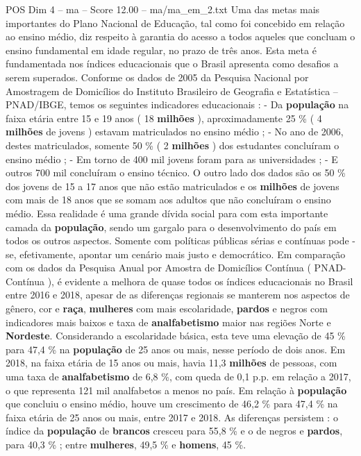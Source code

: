 \begin{textsample}{POS Dim 4 – ma – Score 12.00 – ma/ma\_em\_2.txt}
Uma das metas mais importantes do Plano Nacional de Educação, tal como foi concebido em relação ao ensino médio, diz respeito à garantia do acesso a todos aqueles que concluam o ensino fundamental em idade regular, no prazo de três anos.
Esta meta é fundamentada nos índices educacionais que o Brasil apresenta como desafios a serem superados.
Conforme os dados de 2005 da Pesquisa Nacional por Amostragem de Domicílios do Instituto Brasileiro de Geografia e Estatística – PNAD/IBGE, temos os seguintes indicadores educacionais : - Da \textbf{população} na faixa etária entre 15 e 19 anos ( 18 \textbf{milhões} ), aproximadamente 25 \% ( 4 \textbf{milhões} de jovens ) estavam matriculados no ensino médio ; - No ano de 2006, destes matriculados, somente 50 \% ( 2 \textbf{milhões} ) dos estudantes concluíram o ensino médio ; - Em torno de 400 mil jovens foram para as universidades ; - E outros 700 mil concluíram o ensino técnico.
O outro lado dos dados são os 50 \% dos jovens de 15 a 17 anos que não estão matriculados e os \textbf{milhões} de jovens com mais de 18 anos que se somam aos adultos que não concluíram o ensino médio.
Essa realidade é uma grande dívida social para com esta importante camada da \textbf{população}, sendo um gargalo para o desenvolvimento do país em todos os outros aspectos.
Somente com políticas públicas sérias e contínuas pode -se, efetivamente, apontar um cenário mais justo e democrático.
Em comparação com os dados da Pesquisa Anual por Amostra de Domicílios Contínua ( PNAD-Contínua ), é evidente a melhora de quase todos os índices educacionais no Brasil entre 2016 e 2018, apesar de as diferenças regionais se manterem nos aspectos de gênero, cor e \textbf{raça}, \textbf{mulheres} com mais escolaridade, \textbf{pardos} e negros com indicadores mais baixos e taxa de \textbf{analfabetismo} maior nas regiões Norte e \textbf{Nordeste}.
Considerando a escolaridade básica, esta teve uma elevação de 45 \% para 47,4 \% na \textbf{população} de 25 anos ou mais, nesse período de dois anos.
Em 2018, na faixa etária de 15 anos ou mais, havia 11,3 \textbf{milhões} de pessoas, com uma taxa de \textbf{analfabetismo} de 6,8 \%, com queda de 0,1 p.p. em relação a 2017, o que representa 121 mil analfabetos a menos no país.
Em relação à \textbf{população} que concluiu o ensino médio, houve um crescimento de 46,2 \% para 47,4 \% na faixa etária de 25 anos ou mais, entre 2017 e 2018.
As diferenças persistem : o índice da \textbf{população} de \textbf{brancos} cresceu para 55,8 \% e o de negros e \textbf{pardos}, para 40,3 \% ; entre \textbf{mulheres}, 49,5 \% e \textbf{homens}, 45 \%.

\end{textsample}
